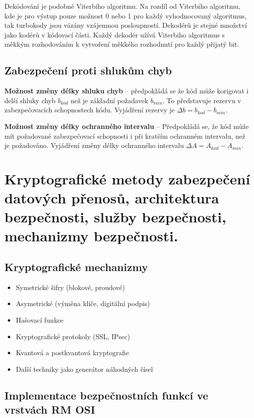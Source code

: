 Dekódování je podobné Viterbiho algoritmu.
Na rozdíl od Viterbiho algoritmu, kde je pro výstup pouze možnost 0 nebo 1 pro každý vyhodnocovaný algoritmus, tak turbokody jsou vázány vzájemnou posloupností.
Dekodérů je stejné množství jako kodérů v kódovací části.
Každý dekodér užívá Viterbiho algoritmus s měkkým rozhodováním k vytvoření měkkého rozhodnutí pro každý přijatý bit.

\subsection{Zabezpečení proti shlukům chyb}

\textbf{Možnost změny délky shluku chyb} -- předpokládá se že kód může korigovat i delší shluky chyb $b_{kod}$ než je základní požadavek $b_{min}$.
To představuje rezervu v zabezpečovacích schopnostech kódu. 
Vyjádření rezervy je $\Delta b = b_{kod} - b_{min}$.

\textbf{Možnost změny délky ochranného intervalu} -- Předpokládá se, že kód může mít požadované zabezpečovací schopnosti i při kratším ochranném intervalu, než je požadováno.
Vyjádření změny délky ochranného intervalu $\Delta A = A_{kod} - A_{min}$.


\clearpage
\section{Kryptografické metody zabezpečení datových přenosů, architektura bezpečnosti, služby bezpečnosti, mechanizmy bezpečnosti.}

\subsection{Kryptografické mechanizmy}

\begin{itemize}
    \item Symetrické šifry (blokové, proudové)
    \item Asymetrické (výměna klíče, digitální podpis)
    \item Hašovací funkce
    \item Kryptografické protokoly (SSL, IPsec)
    \item Kvantová a postkvantová kryptografie
    \item Další techniky jako generátor náhodných čísel
\end{itemize}

\subsection{Implementace bezpečnostních funkcí ve vrstvách RM OSI}


